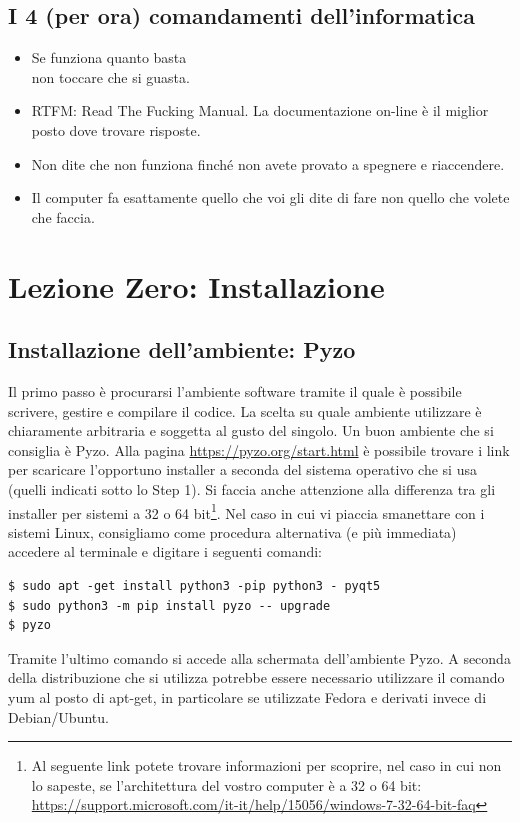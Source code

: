 \documentclass[10pt,a4paper]{article}
\begin{document}
\subsection{I 4 (per ora) comandamenti dell'informatica}
\begin{itemize}
\item Se funziona quanto basta\\
non toccare che si guasta.
\item RTFM: Read The Fucking Manual. La documentazione on-line è il miglior posto dove trovare risposte.
\item Non dite che non funziona finché non avete provato a spegnere e riaccendere.
\item Il computer fa esattamente quello che voi gli dite di fare non quello che volete che faccia.
\end{itemize}

\newpage

\section{Lezione Zero: Installazione}
\subsection{Installazione dell'ambiente: Pyzo}
Il primo passo è procurarsi l'ambiente software tramite il quale è possibile scrivere, gestire e compilare il codice. La scelta su quale ambiente utilizzare è chiaramente arbitraria e soggetta al gusto del singolo. Un buon ambiente che si consiglia è Pyzo. Alla pagina \url{https://pyzo.org/start.html} è possibile trovare i link per scaricare l'opportuno installer a seconda del sistema operativo che si usa (quelli indicati sotto lo Step 1). Si faccia anche attenzione alla differenza tra gli installer per sistemi a 32 o 64 bit\footnote{Al seguente link potete trovare informazioni per scoprire, nel caso in cui non lo sapeste, se l'architettura del vostro computer è a 32 o 64 bit: \url{https://support.microsoft.com/it-it/help/15056/windows-7-32-64-bit-faq}}. Nel caso in cui vi piaccia smanettare con i sistemi Linux, consigliamo come procedura alternativa (e più immediata) accedere al terminale e digitare i seguenti comandi:
\begin{lstlisting}
$ sudo apt -get install python3 -pip python3 - pyqt5
$ sudo python3 -m pip install pyzo -- upgrade
$ pyzo
\end{lstlisting}
Tramite l'ultimo comando si accede alla schermata dell'ambiente Pyzo. A seconda della distribuzione che si utilizza potrebbe essere necessario utilizzare il comando yum al posto di apt-get, in particolare se utilizzate Fedora e derivati invece di Debian/Ubuntu.
\end{document}
